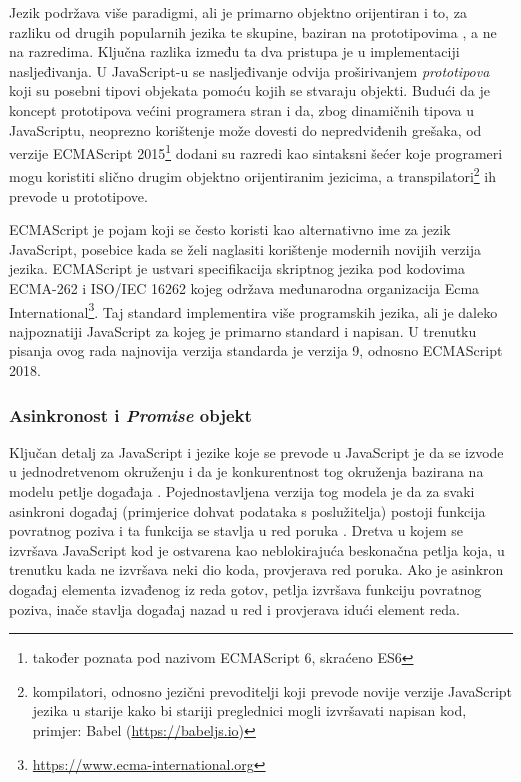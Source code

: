 \documentclass[times, utf8, diplomski, numeric]{fer}
\newcommand{\razmakp}{\vspace{18pt}}
\begin{document}
Jezik podržava više paradigmi, ali je primarno objektno orijentiran i to, za razliku od drugih popularnih jezika te skupine, baziran na prototipovima , a ne na razredima.
Ključna razlika između ta dva pristupa je u implementaciji nasljeđivanja. U JavaScript-u se nasljeđivanje odvija proširivanjem \emph{prototipova} koji su posebni tipovi objekata pomoću kojih se stvaraju objekti.\citep{wiki_proto_prog}
Budući da je koncept prototipova većini programera stran i da, zbog dinamičnih tipova u JavaScriptu, neoprezno korištenje može dovesti do nepredviđenih grešaka, od verzije ECMAScript 2015\footnote{
    također poznata pod nazivom ECMAScript 6, skraćeno ES6
} dodani su razredi kao sintaksni šećer  koje programeri mogu koristiti slično drugim objektno orijentiranim jezicima, a transpilatori\footnote{
    kompilatori, odnosno jezični prevoditelji koji prevode novije verzije JavaScript jezika u starije kako bi stariji preglednici mogli izvršavati napisan kod, primjer: Babel (\url{https://babeljs.io})
} ih prevode u prototipove\citep{mdn_class}.

\razmakp

ECMAScript je pojam koji se često koristi kao alternativno ime za jezik JavaScript, posebice kada se želi naglasiti korištenje modernih novijih verzija jezika.
ECMAScript je ustvari specifikacija skriptnog jezika pod kodovima ECMA-262 i ISO/IEC 16262 kojeg održava međunarodna organizacija Ecma International\footnote{\url{https://www.ecma-international.org}}.
Taj standard implementira više programskih jezika, ali je daleko najpoznatiji JavaScript za kojeg je primarno standard i napisan.
U trenutku pisanja ovog rada najnovija verzija standarda je verzija 9, odnosno ECMAScript 2018.\citep{wiki_es}

\razmakp
\subsubsection{Asinkronost i \emph{Promise} objekt} \label{sec:async}

Ključan detalj za JavaScript i jezike koje se prevode u JavaScript je da se izvode u jednodretvenom okruženju i da je konkurentnost tog okruženja bazirana na modelu petlje događaja .
Pojednostavljena verzija tog modela je da za svaki asinkroni događaj (primjerice dohvat podataka s poslužitelja) postoji funkcija povratnog poziva  i ta funkcija se stavlja u red poruka .
Dretva u kojem se izvršava JavaScript kod je ostvarena kao neblokirajuća beskonačna petlja koja, u trenutku kada ne izvršava neki dio koda, provjerava red poruka.
Ako je asinkron događaj elementa izvađenog iz reda gotov, petlja izvršava funkciju povratnog poziva, inače stavlja događaj nazad u red i provjerava idući element reda.\citep{mdn_event_loop}
\end{document}
